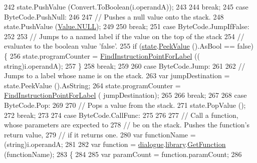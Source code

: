 \begin{DoxyCode}
242                 state.PushValue (Convert.ToBoolean(i.operandA));
243 
244                 \textcolor{keywordflow}{break};
245             \textcolor{keywordflow}{case} ByteCode.PushNull:
246 
247                 \textcolor{comment}{// Pushes a null value onto the stack.}
248                 state.PushValue (\hyperlink{a00100_a1ed2964965baca8621c45efa23f37660}{Value.NULL});
249 
250                 \textcolor{keywordflow}{break};
251             \textcolor{keywordflow}{case} ByteCode.JumpIfFalse:
252 
253                 \textcolor{comment}{// Jumps to a named label if the value on the top of the stack}
254                 \textcolor{comment}{// evaluates to the boolean value 'false'.}
255                 \textcolor{keywordflow}{if} (\hyperlink{a00086_a70f2ce6201cdd2430ceaa764ac614ca0}{state}.\hyperlink{a00089_a54fd5b64ec94e937e771846167242dc2}{PeekValue} ().AsBool == \textcolor{keyword}{false}) \{
256                     state.programCounter = \hyperlink{a00086_af613c8b2d098678b6ea05b509c0a0cb6}{FindInstructionPointForLabel} ((\textcolor{keywordtype}{
      string})i.operandA);
257                 \}
258                 \textcolor{keywordflow}{break};
259 
260             \textcolor{keywordflow}{case} ByteCode.Jump:
261 
262                 \textcolor{comment}{// Jumps to a label whose name is on the stack.}
263                 var jumpDestination = state.PeekValue ().AsString;
264                 state.programCounter = \hyperlink{a00086_af613c8b2d098678b6ea05b509c0a0cb6}{FindInstructionPointForLabel} (
      jumpDestination);
265 
266                 \textcolor{keywordflow}{break};
267 
268             \textcolor{keywordflow}{case} ByteCode.Pop:
269 
270                 \textcolor{comment}{// Pops a value from the stack.}
271                 state.PopValue ();
272                 \textcolor{keywordflow}{break};
273 
274             \textcolor{keywordflow}{case} ByteCode.CallFunc:
275 
276 
277                 \textcolor{comment}{// Call a function, whose parameters are expected to}
278                 \textcolor{comment}{// be on the stack. Pushes the function's return value,}
279                 \textcolor{comment}{// if it returns one.}
280                 var functionName = (string)i.operandA;
281 
282                 var \textcolor{keyword}{function} = \hyperlink{a00086_ac506426c503da5f033247c29e11c5e82}{dialogue}.\hyperlink{a00050_ae660d4cfb6e296358d2f61d8ee74c66a}{library}.\hyperlink{a00063_aacfb1f00ad8aa3921941b8d8af0960e0}{GetFunction} (functionName);
283                 \{
284 
285                     var paramCount = function.paramCount;
286 

\end{DoxyCode}
